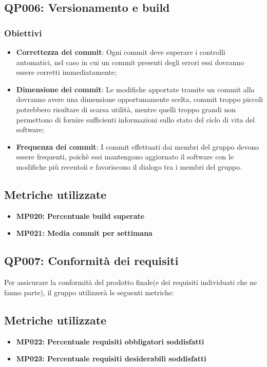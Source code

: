 \subsection{QP006: Versionamento e build}
\subsubsection{Obiettivi}
\begin{itemize}
	\item \textbf{Correttezza dei commit}: Ogni commit deve superare i controlli automatici, nel caso in cui un commit presenti degli errori  essi dovranno essere corretti immediatamente;
	\item \textbf{Dimensione dei commit}: Le modifiche apportate tramite un commit alla  dovranno avere una dimensione opportunamente scelta, commit troppo piccoli potrebbero risultare di scarsa utilità, mentre quelli troppo grandi non permettono di fornire sufficienti informazioni sullo stato del ciclo di vita del software;
	\item  \textbf{Frequenza dei commit}: I commit effettuati dai membri del gruppo devono essere frequenti, poichè essi mantengono aggiornato il software con le modifiche più recentoìi e favoriscono il dialogo tra i membri del gruppo.

\end{itemize}
\subsection{Metriche utilizzate}
\begin{itemize}
	\item \textbf{MP020: Percentuale build superate}
	\item \textbf{MP021: Media commit per settimana}
\end{itemize}

\subsection{QP007: Conformità dei requisiti}
Per assicurare la conformità del prodotto finale(e dei requisiti individuati che ne fanno parte), il gruppo utilizzerà le seguenti metriche:

\subsection{Metriche utilizzate}
\begin{itemize}
	\item \textbf{MP022: Percentuale requisiti obbligatori soddisfatti}
	\item \textbf{MP023: Percentuale requisiti desiderabili soddisfatti}
\end{itemize}

